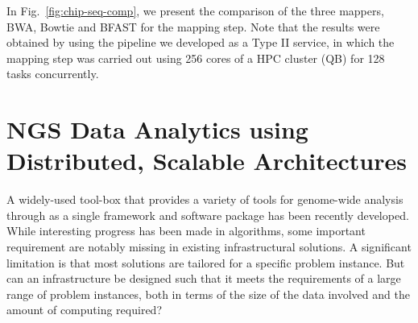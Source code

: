 \documentclass{cpeauth}
\begin{document}
 In Fig.~\ref{fig:chip-seq-comp}, we present the comparison of the
 three mappers, BWA, Bowtie and BFAST for the mapping step.  Note that
 the results were obtained by using the pipeline we developed as a
 Type II service, in which the mapping step was carried out using 256
 cores of a HPC cluster (QB) for 128 tasks concurrently.
 

\section{NGS Data Analytics using Distributed, Scalable Architectures}







A widely-used tool-box that provides a variety of tools for
genome-wide analysis through as a single framework and software
package has been recently developed\cite{galaxy}.  While interesting
progress has been made in algorithms, some important requirement are
notably missing in existing infrastructural solutions.  A significant
limitation is that most solutions are tailored for a specific problem
instance. But can an infrastructure be designed such that it meets the
requirements of a large range of problem instances, both in terms of
the size of the data involved and the amount of computing required?
\end{document}
